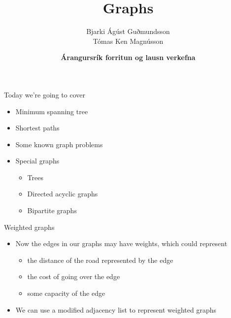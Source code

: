 \documentclass[10pt]{beamer}
\title{Graphs}
\author{Bjarki Ágúst Guðmundsson\\ Tómas Ken Magnússon}
\institute{\href{http://ru.is/td}{School of Computer Science} \\[2pt] \href{http://ru.is}{Reykjavík University}}
\date{\textbf{Árangursrík forritun og lausn verkefna}}
\newcommand{\bi}{\begin{itemize}}
\newcommand{\ei}{\end{itemize}}
\begin{document}
\maketitle

\begin{frame}{Today we're going to cover}
    \bi
        \item Minimum spanning tree
        \item Shortest paths
        \item Some known graph problems
        \item Special graphs
            \bi
                \item Trees
                \item Directed acyclic graphs
                \item Bipartite graphs
            \ei

    \ei
\end{frame}


\begin{frame}{Weighted graphs}
    \bi
        \item Now the edges in our graphs may have weights, which could represent
            \bi
                \item the distance of the road represented by the edge
                \item the cost of going over the edge
                \item some capacity of the edge
            \ei

        \item We can use a modified adjacency list to represent weighted graphs
    \ei
\end{frame}
\end{document}
